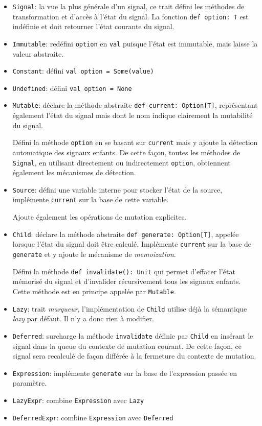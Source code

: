 \begin{itemize}
	\item \texttt{Signal}: la vue la plus générale d'un signal, ce trait défini les méthodes de transformation et d'accès à l'état du signal. La fonction \texttt{def option: T} est indéfinie et doit retourner l'état courante du signal.
	\item \texttt{Immutable}: redéfini \texttt{option} en \texttt{val} puisque l'état est immutable, mais laisse la valeur abstraite.
	\item \texttt{Constant}: défini \texttt{val option = Some(value)}
	\item \texttt{Undefined}: défini \texttt{val option = None}
	\item \texttt{Mutable}: déclare la méthode abstraite \texttt{def current: Option[T]}, représentant également l'état du signal mais dont le nom indique clairement la mutabilité du signal.
	
	Défini la méthode \texttt{option} en se basant sur \texttt{current} mais y ajoute la détection automatique des signaux enfants. De cette façon, toutes les méthodes de \texttt{Signal}, en utilisant directement ou indirectement \texttt{option}, obtiennent également les mécanismes de détection.
	
	\item \texttt{Source}: défini une variable interne pour stocker l'état de la source, implémente \texttt{current} sur la base de cette variable.
	
	Ajoute également les opérations de mutation explicites.
	
	\item \texttt{Child}: déclare la méthode abstraite \texttt{def generate: Option[T]}, appelée lorsque l'état du signal doit être calculé. Implémente \texttt{current} sur la base de \texttt{generate} et y ajoute le mécanisme de \emph{memoization}.
	
	Défini la méthode \texttt{def invalidate(): Unit} qui permet d'effacer l'état mémorisé du signal et d'invalider récursivement tous les signaux enfants. Cette méthode est en principe appelée par \texttt{Mutable}.
	
	\item \texttt{Lazy}: trait \emph{marqueur}, l'implémentation de \texttt{Child} utilise déjà la sémantique \emph{lazy} par défaut. Il n'y a donc rien à modifier.
	
	\item \texttt{Deferred}: surcharge la méthode \texttt{invalidate} définie par \texttt{Child} en insérant le signal dans la queue du contexte de mutation courant. De cette façon, ce signal sera recalculé de façon différée à la fermeture du contexte de mutation.
	
	\item \texttt{Expression}: implémente \texttt{generate} sur la base de l'expression passée en paramètre.
	
	\item \texttt{LazyExpr}: combine \texttt{Expression} avec \texttt{Lazy}
	\item \texttt{DeferredExpr}: combine \texttt{Expression} avec \texttt{Deferred}
\end{itemize}

